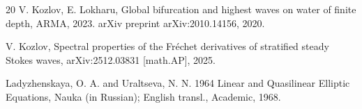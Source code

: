 \documentclass[a4paper,reqno,12pt]{amsart}
\theoremstyle{plain}
\theoremstyle{definition}
\numberwithin{equation}{section}
\begin{document}
{\begin{thebibliography}{20}
 V. Kozlov, E. Lokharu, Global bifurcation and highest waves on water of
finite depth, ARMA, 2023.
arXiv preprint arXiv:2010.14156, 2020.

 V. Kozlov, Spectral properties of the Fr\'{e}chet derivatives of stratified steady Stokes waves, arXiv:2512.03831 [math.AP], 2025.







 Ladyzhenskaya, O. A. and Uraltseva, N. N. 1964 Linear and Quasilinear
Elliptic Equations,
Nauka (in Russian); English transl., Academic, 1968.









\end{thebibliography}}
\end{document}
